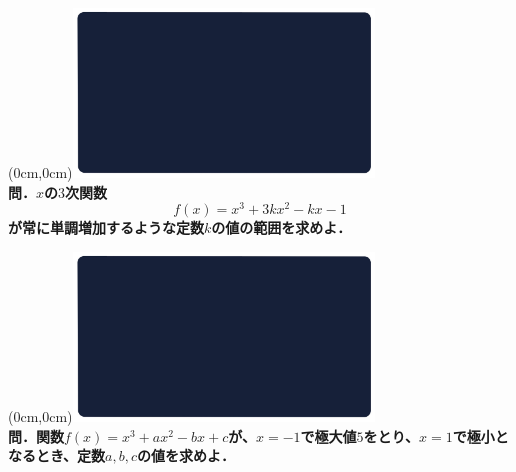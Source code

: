 \documentclass[10pt,
fleqn,
dvipdfmx,
uplatex
]{jsarticle}
\begin{document}
\newpage



\at(0cm,0cm){\includegraphics[width=8cm,bb=0 0 1920 1080]{./media_local/smart_background/数II微積.jpeg}}
\vspace{0.3zw}\\
\noindent\Large 
\bf\boldmath 問．$x$の$3$次関数
\[f\left(x\right)=x^3+3kx^2-kx-1\]
が常に単調増加するような定数$k$の値の範囲を求めよ．


\newpage



\at(0cm,0cm){\includegraphics[width=8cm,bb=0 0 1920 1080]{./media_local/smart_background/数II微積.jpeg}}
\vspace{0.3zw}\\
\noindent\Large 
\bf\boldmath 問．関数$f\left(x\right)=x^3+ax^2-bx+c$が、$x=-1$で極大値$5$をとり、$x=1$で極小となるとき、定数$a,b,c$の値を求めよ．
\end{document}
